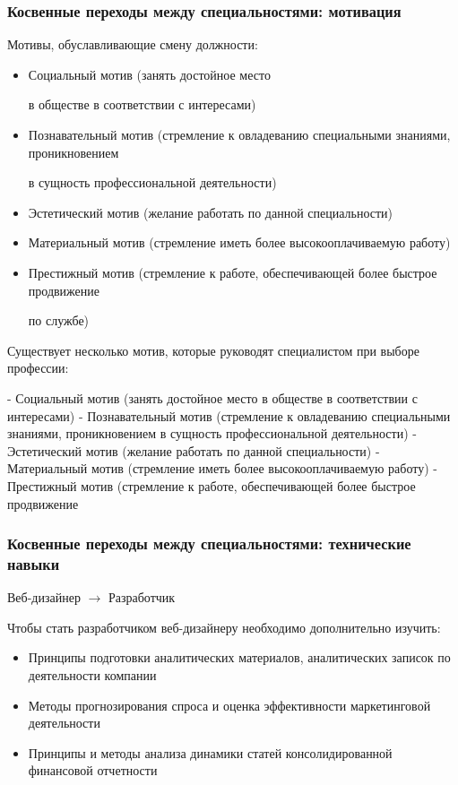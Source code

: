 \documentclass{../industrial-development}
\begin{document}
\begin{frame} \frametitle{Косвенные переходы между специальностями: мотивация }

 \begin{block}{}
Мотивы, обуславливающие смену должности:
  \end{block}
\begin{itemize}
\item Социальный мотив (занять достойное место 

в обществе в соответствии с интересами)
\item Познавательный мотив (стремление к овладеванию специальными знаниями, проникновением 

в сущность профессиональной деятельности)
\item Эстетический мотив (желание работать по данной специальности)
\item Материальный мотив (стремление иметь более высокооплачиваемую работу) 
\item Престижный мотив (стремление к работе, обеспечивающей более быстрое продвижение 

по службе)
  \end{itemize}
\end{frame}

\lecturenotes

Существует несколько мотив, которые руководят специалистом при выборе профессии:

- Социальный мотив (занять достойное место 
в обществе в соответствии с интересами)
- Познавательный мотив (стремление к овладеванию специальными знаниями, проникновением 
в сущность профессиональной деятельности)
- Эстетический мотив (желание работать по данной специальности)
- Материальный мотив (стремление иметь более высокооплачиваемую работу) 
- Престижный мотив (стремление к работе, обеспечивающей более быстрое продвижение 


\begin{frame} \frametitle{Косвенные переходы между специальностями: технические навыки }

\begin{block}{Веб-дизайнер $\rightarrow$ Разработчик }

Чтобы стать разработчиком веб-дизайнеру необходимо дополнительно изучить:
  \end{block}
\begin{itemize}
  \item Принципы подготовки аналитических материалов, аналитических записок по деятельности компании
  \item Методы прогнозирования спроса и оценка эффективности маркетинговой деятельности
\item Принципы и методы анализа динамики статей консолидированной финансовой отчетности
  \end{itemize}
\end{frame}
\end{document}
